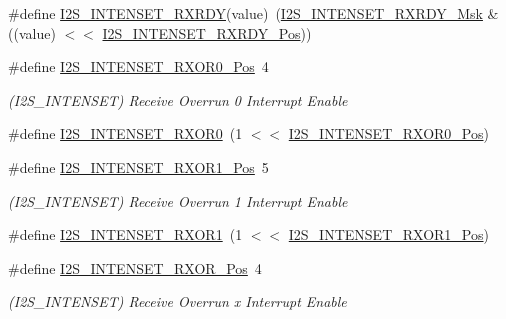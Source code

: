 \begin{DoxyCompactItemize}
\item 
\#define \mbox{\hyperlink{group___s_a_m_d21___i2_s_gacf810abfdd9e9b21179e4b7e5ca69893}{I2\+S\+\_\+\+I\+N\+T\+E\+N\+S\+E\+T\+\_\+\+R\+X\+R\+DY}}(value)~(\mbox{\hyperlink{group___s_a_m_d21___i2_s_ga6ee165031f3205ebaf462f6b6a1f09ea}{I2\+S\+\_\+\+I\+N\+T\+E\+N\+S\+E\+T\+\_\+\+R\+X\+R\+D\+Y\+\_\+\+Msk}} \& ((value) $<$$<$ \mbox{\hyperlink{group___s_a_m_d21___i2_s_ga6a83119896f3ef19f62b84b85047291b}{I2\+S\+\_\+\+I\+N\+T\+E\+N\+S\+E\+T\+\_\+\+R\+X\+R\+D\+Y\+\_\+\+Pos}}))
\item 
\#define \mbox{\hyperlink{group___s_a_m_d21___i2_s_ga329b94c3981eea317584e01a84bbc23b}{I2\+S\+\_\+\+I\+N\+T\+E\+N\+S\+E\+T\+\_\+\+R\+X\+O\+R0\+\_\+\+Pos}}~4
\begin{DoxyCompactList}\small\item\em (I2\+S\+\_\+\+I\+N\+T\+E\+N\+S\+ET) Receive Overrun 0 Interrupt Enable \end{DoxyCompactList}\item 
\#define \mbox{\hyperlink{group___s_a_m_d21___i2_s_gae892bf14f0577ca0761c327ee273afe5}{I2\+S\+\_\+\+I\+N\+T\+E\+N\+S\+E\+T\+\_\+\+R\+X\+O\+R0}}~(1 $<$$<$ \mbox{\hyperlink{group___s_a_m_d21___i2_s_ga329b94c3981eea317584e01a84bbc23b}{I2\+S\+\_\+\+I\+N\+T\+E\+N\+S\+E\+T\+\_\+\+R\+X\+O\+R0\+\_\+\+Pos}})
\item 
\#define \mbox{\hyperlink{group___s_a_m_d21___i2_s_gaa80578c073e672c92eb123cda1edd527}{I2\+S\+\_\+\+I\+N\+T\+E\+N\+S\+E\+T\+\_\+\+R\+X\+O\+R1\+\_\+\+Pos}}~5
\begin{DoxyCompactList}\small\item\em (I2\+S\+\_\+\+I\+N\+T\+E\+N\+S\+ET) Receive Overrun 1 Interrupt Enable \end{DoxyCompactList}\item 
\#define \mbox{\hyperlink{group___s_a_m_d21___i2_s_gad455f0bfa8c5c8181ab663a22f8e4040}{I2\+S\+\_\+\+I\+N\+T\+E\+N\+S\+E\+T\+\_\+\+R\+X\+O\+R1}}~(1 $<$$<$ \mbox{\hyperlink{group___s_a_m_d21___i2_s_gaa80578c073e672c92eb123cda1edd527}{I2\+S\+\_\+\+I\+N\+T\+E\+N\+S\+E\+T\+\_\+\+R\+X\+O\+R1\+\_\+\+Pos}})
\item 
\#define \mbox{\hyperlink{group___s_a_m_d21___i2_s_ga85f713671974c54bdf903cbc6767f5d0}{I2\+S\+\_\+\+I\+N\+T\+E\+N\+S\+E\+T\+\_\+\+R\+X\+O\+R\+\_\+\+Pos}}~4
\begin{DoxyCompactList}\small\item\em (I2\+S\+\_\+\+I\+N\+T\+E\+N\+S\+ET) Receive Overrun x Interrupt Enable \end{DoxyCompactList}\item 
$$
\end{DoxyCompactItemize}
